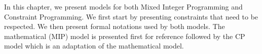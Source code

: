 \documentclass[../../thesis.tex]{subfiles}
\begin{document}
In this chapter, we present models for both Mixed Integer Programming and Constraint Programming.
We first start by presenting constraints that need to be respected. We then present formal notations used 
by both models. The mathematical (MIP) model is presented first for reference followed by the CP model which 
is an adaptation of the mathematical model.
\end{document}
